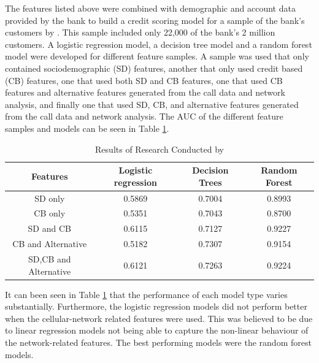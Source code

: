  The features listed above were combined with demographic and account data provided by the bank to build a credit scoring model for a sample of the bank's customers by \textcite{BigDataMicroFiance}. This sample included only 22,000 of the bank's 2 million customers. A logistic regression model, a decision tree model and a random forest model were developed for different feature samples. A sample was used that only contained sociodemographic (SD) features, another that only used credit based (CB) features, one that used both SD and CB features, one that used CB features and alternative features generated from the call data and network analysis, and finally one that used SD, CB, and alternative features generated from the call data and network analysis. The AUC of the different feature samples and models can be seen in Table \ref{table:alt}. 

\vspace{10pt}

\begin{table}[H]
\begin{center}
\begin{tabular}{|c|c|c|c|} 
\hline
\multicolumn{1}{|c}{Features}  &\multicolumn{1}{|c|}{Logistic regression}  &\multicolumn{1}{|c|}{Decision Trees} & \multicolumn{1}{c|}{Random Forest}\\
\hline
SD only  & 0.5869 &  0.7004 & 0.8993  \\
\hline
CB only & 0.5351 & 0.7043 & 0.8700  \\
\hline
SD and CB & 0.6115 & 0.7127 & 0.9227  \\
\hline
CB and Alternative & 0.5182 & 0.7307 & 0.9154  \\
\hline
SD,CB and Alternative & 0.6121 & 0.7263 & 0.9224  \\
\hline
\end{tabular}
\end{center}
\caption{Results of Research Conducted by \textcite{BigDataMicroFiance}}
\label{table:alt}
\end{table}

\vspace{10pt}
 
 
It can been seen in Table \ref{table:alt} that the performance of each
model type varies substantially. Furthermore, the logistic
regression models did not perform better when the
cellular-network related features were used. This was believed to be due to linear regression models not being able to capture the non-linear behaviour of the network-related features. The best performing models were the random forest models. \\

